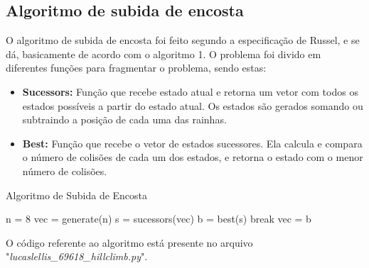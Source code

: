 \documentclass[conference]{IEEEtran}
\begin{document}
	\subsection{Algoritmo de subida de encosta}
	O algoritmo de subida de encosta foi feito segundo a especificação de Russel\cite{norvig2014inteligencia}, e se dá, basicamente de acordo com o algoritmo 1. O problema foi divido em diferentes funções para fragmentar o problema, sendo estas:
	\begin{itemize}
		\item \textbf{Sucessors:} Função que recebe estado atual e retorna um vetor com todos os estados possíveis a partir
		do estado atual. Os estados são gerados somando ou subtraindo a posição de cada uma das rainhas.
		\item \textbf{Best:} Função que recebe o vetor de estados sucessores. Ela calcula e compara o número de colisões
		de cada um dos estados, e retorna o estado com o menor número de colisões.
	\end{itemize}
	\begin{algorithm}
		\caption{Algoritmo de Subida de Encosta}
		\begin{algorithmic}[1]
			\STATE n = 8 
			\STATE vec = generate(n)
			\STATE s = sucessors(vec)
			\STATE b = best(s)
			\STATE break
			\ELSE
			\STATE	vec = b
			\ENDIF
			\ENDWHILE
		\end{algorithmic} 
	\end{algorithm}
	O código referente ao algoritmo está presente no arquivo "\textit{lucaslellis\_69618\_hillclimb.py}". 
\end{document}
